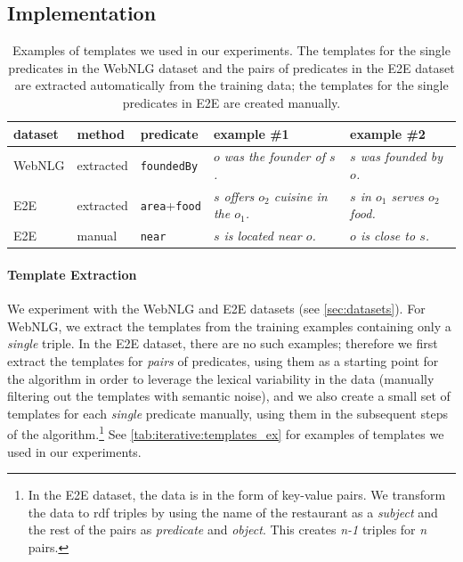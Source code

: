 \subsection{Implementation}


\begin{table}[t]
    \centering\footnotesize
    \begin{tabular}{lllll}
        \textbf{dataset} & \textbf{method} & \textbf{predicate}          & \textbf{example \#1}                            & \textbf{example \#2}                     \\\midrule
        WebNLG           & extracted       & \texttt{foundedBy}          & \textit{$o$ was the founder of $s$.}            & \textit{$s$ was founded by $o$.}         \\
        E2E              & extracted       & \texttt{area}+\texttt{food} & \textit{$s$ offers $o_2$ cuisine in the $o_1$.} & \textit{$s$ in $o_1$ serves $o_2$ food.} \\
        E2E              & manual          & \texttt{near}               & \textit{$s$ is located near $o$.}               & \textit{$o$ is close to $s$.}
    \end{tabular}
    \caption{Examples of templates we used in our experiments. The templates for the single predicates in the WebNLG dataset and the pairs of predicates in the E2E dataset are extracted automatically from the training data; the templates for the single predicates in E2E are created manually.}
    \label{tab:iterative:templates_ex}
\end{table}


\paragraph{Template Extraction} We experiment with the WebNLG and E2E datasets (see \autoref{sec:datasets}). For WebNLG, we extract the templates from the training examples containing only a \textit{single} triple. In the E2E dataset, there are no such examples; therefore we first extract the templates for \textit{pairs} of predicates, using them as a starting point for the algorithm in order to leverage the lexical variability in the data (manually filtering out the templates with semantic noise), and we also create a small set of templates for each \textit{single} predicate manually, using them in the subsequent steps of the algorithm.\footnote{In the E2E dataset, the data is in the form of key-value pairs. We transform the data to \ac{rdf} triples by using the name of the restaurant as a \textit{subject} and the rest of the pairs as \textit{predicate} and \textit{object}. This creates \textit{n-1} triples for \textit{n} pairs.} See \autoref{tab:iterative:templates_ex} for examples of templates we used in our experiments.

